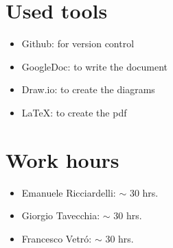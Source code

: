 \documentclass[10pt, a4paper,titlepage]{article}
\begin{document}
\section*{Used tools}
\begin{itemize}
\item Github: for version control
\item GoogleDoc: to write the document
\item Draw.io: to create the diagrams
\item \LaTeX: to create the pdf
\end{itemize}
\section*{Work hours} 
\begin{itemize}
\item Emanuele Ricciardelli: $\sim$ 30 hrs.
\item Giorgio Tavecchia: $\sim$ 30 hrs.
\item Francesco Vetr\'o: $\sim$ 30 hrs.
\end{itemize}
\end{document}
